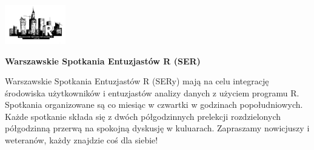 \documentclass[\main/boa.tex]{subfiles}
\begin{document}
	
	\begin{minipage}[t]{0.915\textwidth}
		\center     
		\includegraphics[width=100px]{img/logos.bw/ser.png} 
	\end{minipage}
	\begin{center}
	\Large \textbf {Warszawskie Spotkania Entuzjastów R (SER)}
	\end{center}
	
	\vskip 0.3cm
	\normalsize 
	Warszawskie Spotkania Entuzjastów R (SERy) mają na celu integrację środowiska użytkowników i entuzjastów analizy danych z użyciem programu R. Spotkania organizowane są co miesiąc w czwartki w godzinach popołudniowych. Każde spotkanie składa się z dwóch półgodzinnych prelekcji rozdzielonych półgodzinną przerwą na spokojną dyskusję w kuluarach. Zapraszamy nowicjuszy i weteranów, każdy znajdzie coś dla siebie!
	
	\vskip 1.5cm
\end{document}
